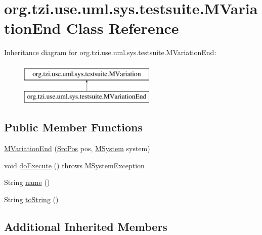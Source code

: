 \hypertarget{classorg_1_1tzi_1_1use_1_1uml_1_1sys_1_1testsuite_1_1_m_variation_end}{\section{org.\-tzi.\-use.\-uml.\-sys.\-testsuite.\-M\-Variation\-End Class Reference}
\label{classorg_1_1tzi_1_1use_1_1uml_1_1sys_1_1testsuite_1_1_m_variation_end}
}
Inheritance diagram for org.\-tzi.\-use.\-uml.\-sys.\-testsuite.\-M\-Variation\-End\-:\begin{figure}[H]
\begin{center}
\leavevmode
\includegraphics[height=2.000000cm]{classorg_1_1tzi_1_1use_1_1uml_1_1sys_1_1testsuite_1_1_m_variation_end}
\end{center}
\end{figure}
\subsection*{Public Member Functions}
\begin{DoxyCompactItemize}
\item 
\hyperlink{classorg_1_1tzi_1_1use_1_1uml_1_1sys_1_1testsuite_1_1_m_variation_end_a5fbc0fd2ad309b46772e0bc2345e1d36}{M\-Variation\-End} (\hyperlink{classorg_1_1tzi_1_1use_1_1parser_1_1_src_pos}{Src\-Pos} pos, \hyperlink{classorg_1_1tzi_1_1use_1_1uml_1_1sys_1_1_m_system}{M\-System} system)
\item 
void \hyperlink{classorg_1_1tzi_1_1use_1_1uml_1_1sys_1_1testsuite_1_1_m_variation_end_ad177215fa490bb8c7601f4c750ab8a27}{do\-Execute} ()  throws M\-System\-Exception 
\item 
String \hyperlink{classorg_1_1tzi_1_1use_1_1uml_1_1sys_1_1testsuite_1_1_m_variation_end_ac87d33c1fc437c8b3dd88b6dc8679250}{name} ()
\item 
String \hyperlink{classorg_1_1tzi_1_1use_1_1uml_1_1sys_1_1testsuite_1_1_m_variation_end_a4731974f0766e3f365f96d23f0aa8212}{to\-String} ()
\end{DoxyCompactItemize}
\subsection*{Additional Inherited Members}


